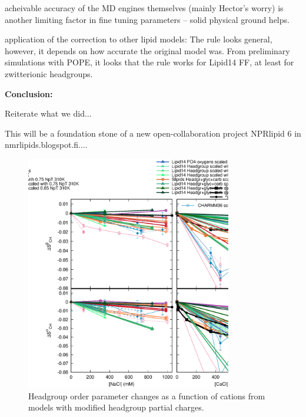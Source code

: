 \documentclass[aip,jcp]{revtex4}
\begin{document}
acheivable accuracy of the MD engines themselves (mainly Hector's worry) is another limiting factor in fine tuning parameters -- solid physical ground helps.

application of the correction to other lipid models: The rule looks general, however, it depends on how accurate the original model was.
From preliminary simulations with POPE, it looks that the rule works for Lipid14 FF, at least for zwitterionic headgroups.

\textbf{Conclusion:}

Reiterate what we did...

This will be a foundation stone of a new open-collaboration project NPRlipid 6 in nmrlipids.blogspot.fi....










\begin{figure}[]
  \centering
  \includegraphics[width=9.0cm]{../Fig/OrderParameterIONSchangesSCALED.eps}
  \caption{\label{OrderParameterIONSchangesSCALED}
    Headgroup order parameter changes as a function of cations from models
    with modified headgroup partial charges.}
\end{figure}
\end{document}
